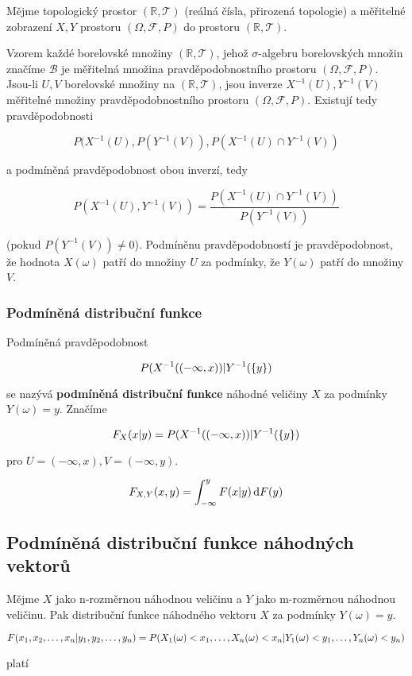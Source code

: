 	Mějme topologický prostor $(\mathbb{R},\mathscr{T})$ (reálná čísla, přirozená topologie) a měřitelné zobrazení $X,Y$ prostoru $(\Omega,\mathscr{F},P)$ do prostoru $(\mathbb{R},\mathscr{T})$.\br
	
	Vzorem každé borelovské množiny $(\mathbb{R},\mathscr{T})$, jehož $\sigma$-algebru borelovských množin značíme $\mathscr{B}$ je měřitelná množina pravděpodobnostního prostoru $(\Omega,\mathscr{F},P)$. Jsou-li $U,V$ borelovské množiny na $(\mathbb{R},\mathscr{T})$, jsou inverze $X^{-1}(U),Y^{-1}(V)$ měřitelné množiny pravděpodobnostního prostoru $(\Omega,\mathscr{F},P)$. Existují tedy pravděpodobnosti
	
	\[ P(X^{-1}(U), P(Y^{-1}(V)), P(X^{-1}(U)\cap Y^{-1}(V)) \]
	
	a podmíněná pravděpodobnost obou inverzí, tedy
	
	\[ P(X^{-1}(U),Y^{-1}(V)) =\frac{P(X^{-1}(U)\cap Y^{-1}(V))}{P(Y^{-1}(V))}\]
	
	(pokud $P(Y^{-1}(V))\neq 0$). Podmíněnu pravděpodobností je pravděpodobnost, že hodnota $X(\omega)$ patří do množiny $U$ za podmínky, že $Y(\omega)$ patří do množiny $V$.
	
	\subsubsection{Podmíněná distribuční funkce}
	Podmíněná pravděpodobnost
	
	\[ P(X^{-1}((-\infty,x))|Y^{-1}(\brs{y}) \]
	
	se nazývá \textbf{podmíněná distribuční funkce} náhodné veličiny $X$ za podmínky $Y(\omega)=y$. Značíme
	
	\[ F_X(x|y)=P(X^{-1}((-\infty,x))|Y^{-1}(\brs{y}) \]
	
	pro $U=(-\infty,x), V=(-\infty,y)$.
	
	\[ F_{X,Y}(x,y)=\int_{-\infty}^y F(x|y)\d F(y) \]
	
	\subsection{Podmíněná distribuční funkce náhodných vektorů}
	Mějme $X$ jako n-rozměrnou náhodnou veličinu a $Y$ jako m-rozměrnou náhodnou veličinu. Pak distribuční funkce náhodného vektoru $X$ za podmínky $Y(\omega)=y$.
	
	\[ F(\vecrow[x]|\vecrow[y]) = P(X_1(\omega)<x_1,\ldots,X_n(\omega)<x_n | Y_1(\omega)<y_1,\ldots,Y_n(\omega)<y_n) \]
	
	platí
	
